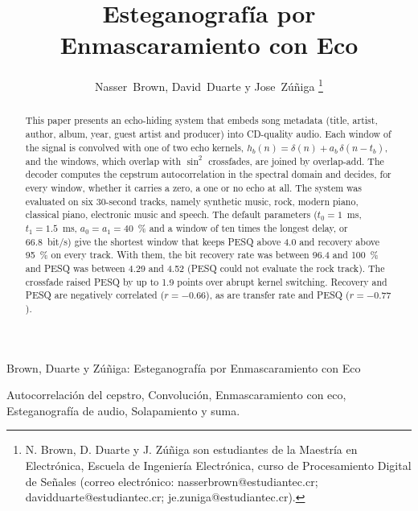 \documentclass[journal]{IEEEtran}
\begin{document}
\title{Esteganografía por Enmascaramiento con Eco}

\author{Nasser~Brown, David~Duarte y Jose~Zúñiga%
\thanks{N. Brown, D. Duarte y J. Zúñiga son estudiantes de la Maestría en Electrónica,
Escuela de Ingeniería Electrónica, curso de Procesamiento Digital de Señales
(correo electrónico: nasserbrown@estudiantec.cr; davidduarte@estudiantec.cr; je.zuniga@estudiantec.cr).}}

%
{Brown, Duarte y Zúñiga: Esteganografía por Enmascaramiento con Eco}

\maketitle

\begin{abstract}
This paper presents an echo-hiding system that embeds song metadata (title,
artist, author, album, year, guest artist and producer) into CD-quality audio.
Each window of the signal is convolved with one of two echo kernels,
$h_b(n)=\delta(n)+a_b\,\delta(n-t_b)$, and the windows, which overlap with
$\sin^2$ crossfades, are joined by overlap-add. The decoder computes the
cepstrum autocorrelation in the spectral domain and decides, for every window,
whether it carries a zero, a one or no echo at all. The system was evaluated on
six 30-second tracks, namely synthetic music, rock, modern piano, classical
piano, electronic music and speech. The default parameters ($t_0=1$~ms,
$t_1=1.5$~ms, $a_0=a_1=40$~\% and a window of ten times the longest delay, or
66.8~bit/s) give the shortest window that keeps PESQ above 4.0 and recovery
above 95~\% on every track. With them, the bit recovery rate was between 96.4
and 100~\% and PESQ was between 4.29 and 4.52 (PESQ could not evaluate the
rock track). The crossfade raised PESQ by up to 1.9 points over abrupt kernel
switching. Recovery and PESQ are negatively correlated ($r=-0.66$), as are
transfer rate and PESQ ($r=-0.77$).
\end{abstract}

\begin{IEEEkeywords}
Autocorrelación del cepstro, Convolución, Enmascaramiento con eco,
Esteganografía de audio, Solapamiento y suma.
\end{IEEEkeywords}

\end{document}
